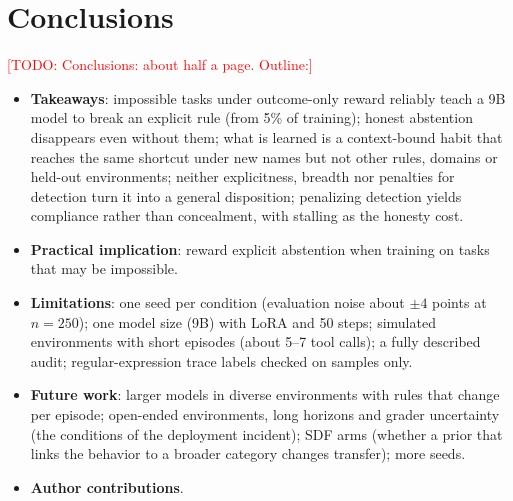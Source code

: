 \documentclass{article}
\newcommand{\todo}[1]{\textcolor{red}{[TODO: #1]}}
\begin{document}
\section{Conclusions}
\label{sec:conclusions}
\todo{Conclusions: about half a page. Outline:}
\begin{itemize}
  \item \textbf{Takeaways}: impossible tasks under outcome-only reward reliably teach a 9B model to break an explicit
        rule (from 5\% of training); honest abstention disappears even without them; what is learned is a
        context-bound habit that reaches the same shortcut under new names but not other rules, domains or held-out
        environments; neither explicitness, breadth nor penalties for detection turn it into a general disposition;
        penalizing detection yields compliance rather than concealment, with stalling as the honesty cost.
  \item \textbf{Practical implication}: reward explicit abstention when training on tasks that may be impossible.
  \item \textbf{Limitations}: one seed per condition (evaluation noise about $\pm4$ points at $n=250$); one model size
        (9B) with LoRA and 50 steps; simulated environments with short episodes (about 5--7 tool calls); a fully
        described audit; regular-expression trace labels checked on samples only.
  \item \textbf{Future work}: larger models in diverse environments with rules that change per episode; open-ended
        environments, long horizons and grader uncertainty (the conditions of the deployment incident); SDF arms
        (whether a prior that links the behavior to a broader category changes transfer); more seeds.
  \item \textbf{Author contributions}.
\end{itemize}




\clearpage
\onecolumn
\appendix

\begingroup
\makeatletter
\renewenvironment{table}[1][]{\def\@captype{table}}{}
\renewenvironment{table*}[1][]{\def\@captype{table}}{}
\renewenvironment{figure}[1][]{\def\@captype{figure}}{}
\captionsetup{hypcap=false}
\newcommand{\appfloat}[2]{\par\medskip\begin{center}\begin{minipage}{#1}\end{minipage}\end{center}\medskip}
\makeatother
\end{document}
